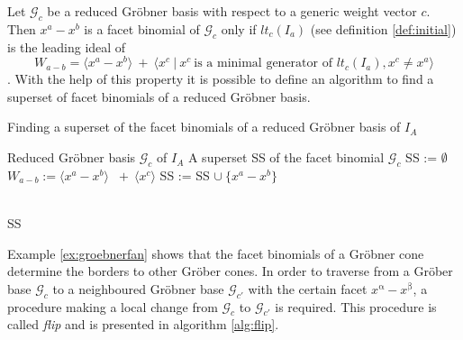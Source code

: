 Let $\mathcal{G}_{c} $ be a reduced Gröbner basis with respect to a generic weight vector $c$. Then $x^{a} - x^{b}$ is a facet binomial of $\mathcal{G}_{c}$ only if $lt_{c}(I_{a})$ (see definition \ref{def:initial}) is the leading ideal of \[W_{a - b} = \langle x^{a}-x^{b}\rangle~+~ \langle x^{c}~|~x^{c}~\textrm{is a minimal generator of~} lt_{c}(I_{a}), x^{c} \neq x^{a} \rangle \] \cite{tigers}.
With the help of this property it is possible to define an algorithm to find a superset of facet binomials of a reduced Gröbner basis.

\begin{algorithm}
\caption{Finding a superset of the facet binomials
of a reduced Gröbner basis of $I_A$ \cite{tigers}}
\label{alg:facetSS}
\begin{algorithmic}[1]

\Input
Reduced Gröbner basis $ \mathcal{G}_{c} $ of $I_A$
\Output A superset SS of the facet binomial $\mathcal{G}_{c}$
\State SS := $\emptyset$
\State $W_{a - b} := \langle x^{a}-x^{b}\rangle$
$~+~ \langle x^{c} \rangle$ 
\State SS := SS $\cup~ \{x^{a}-x^{b} \}$

\EndIf
\EndFor \\
\Return SS

\end{algorithmic}
\end{algorithm}
 

Example \ref{ex:groebnerfan} shows that the facet binomials of a Gröbner cone determine the borders to other Gröber cones.
In order to traverse from a Gröber base $\mathcal{G}_c$ to a neighboured Gröbner base $\mathcal{G}_{c'}$ with the certain facet $x^{\upalpha}-x^{\upbeta} $, a procedure making a local change from $\mathcal{G}_c$ to $\mathcal{G}_{c'}$ is required.
This procedure is called \textit{flip} and is presented in algorithm \ref{alg:flip}. 
\newpage


